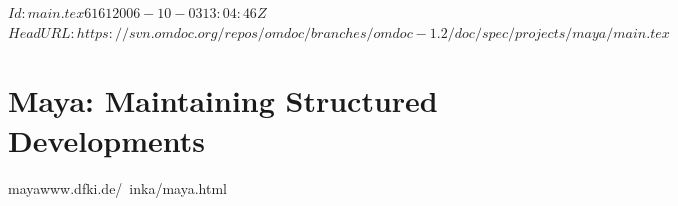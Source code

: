 \svnInfo $Id: main.tex 6161 2006-10-03 13:04:46Z  $
\svnKeyword $HeadURL: https://svn.omdoc.org/repos/omdoc/branches/omdoc-1.2/doc/spec/projects/maya/main.tex $

\section[{\sc Maya}]{Maya: Maintaining Structured Developments}
\begin{project}{maya}{www.dfki.de/~inka/maya.html}
\end{project}

